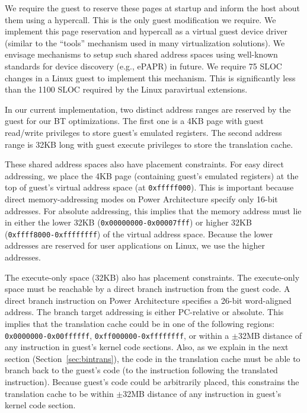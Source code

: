 \documentclass[10pt,twocolumn]{article}
\begin{document}
We require the guest to reserve these pages at startup and inform the host about
them using a hypercall.
This is the only guest modification we require.
We implement this page reservation
and hypercall as a virtual guest device driver (similar to the ``tools'' mechanism
used in many virtualization solutions). We envisage mechanisms to setup
such shared address spaces using well-known standards for device
discovery (e.g., ePAPR\cite{ePAPR}) in future.
We require 75 SLOC changes in a Linux guest to implement this mechanism. This is
significantly less than the 1100 SLOC required by the Linux paravirtual
extensions.

In our current implementation, two distinct address ranges are reserved by the
guest for our BT optimizations.
The first one is a 4KB page with guest read/write privileges
to store guest's emulated registers.  The second address range is 32KB long
with guest execute privileges to store the translation cache.

These shared address spaces also have placement constraints. For easy direct
addressing, we place the 4KB page (containing guest's emulated registers) at
the top of guest's virtual address space (at {\tt 0xfffff000}). This is important 
because direct memory-addressing modes on Power Architecture specify only 16-bit
addresses. For absolute addressing, this implies that the memory
address must lie in either
the lower 32KB ({\tt 0x00000000-0x00007fff}) or higher
32KB ({\tt 0xffff8000-0xffffffff}) of the virtual address space. Because the lower
addresses are reserved for user applications on Linux, we use the higher addresses.

The execute-only space (32KB) also has placement
constraints. The execute-only space must be reachable
by a direct branch instruction from the guest code. A direct branch instruction
on Power Architecture specifies a 26-bit
word-aligned address. The branch target addressing is either PC-relative
or absolute. This implies that the translation cache could be
in one of the following regions: {\tt 0x0000000-0x00ffffff}, {\tt 0xff000000-0xffffffff},
or within a $\pm$32MB distance of any instruction in guest's kernel code sections.
Also, as we explain in the
next section (Section~\ref{sec:bintrans}), the code in the translation cache must
be able to branch
back to the guest's code (to the instruction following the translated instruction).
Because guest's code could be arbitrarily placed, this constrains the translation
cache to be within $\pm$32MB distance of any instruction in
guest's kernel code section.
\end{document}
